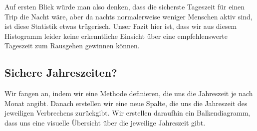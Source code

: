 \documentclass[10pt]{article}
\begin{document}
Auf ersten Blick würde man also denken, dass die sicherste Tageszeit für
einen Trip die Nacht wäre, aber da nachts normalerweise weniger Menschen
aktiv sind, ist diese Statistik etwas trügerisch. Unser Fazit hier ist,
dass wir aus diesem Histogramm leider keine erkenntliche Einsicht über
eine empfehlenswerte Tageszeit zum Rausgehen gewinnen können.

    \subsection{Sichere Jahreszeiten?}\label{sichere-jahreszeiten}

    Wir fangen an, indem wir eine Methode definieren, die uns die Jahreszeit
je nach Monat angibt. Danach erstellen wir eine neue Spalte, die uns die
Jahreszeit des jeweiligen Verbrechens zurückgibt. Wir erstellen
daraufhin ein Balkendiagramm, dass uns eine visuelle Übersicht über die
jeweilige Jahreszeit gibt.
\end{document}
